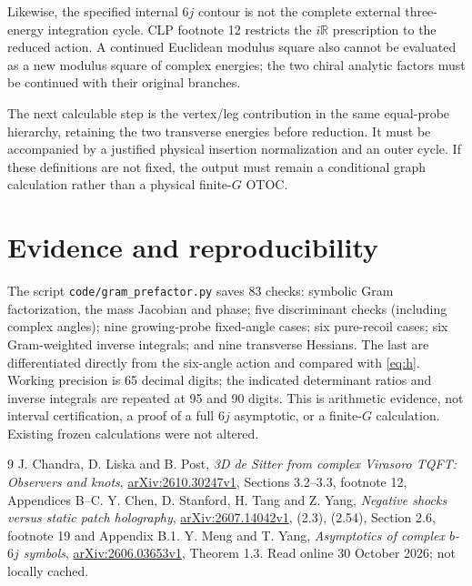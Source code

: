 \documentclass[11pt,a4paper]{article}
\begin{document}
Likewise, the specified internal \(6j\) contour is not the complete
external three-energy integration cycle. CLP footnote 12 restricts
the \(i\mathbb R\) prescription to the reduced action.
A continued Euclidean modulus square also cannot be evaluated as a
new modulus square of complex energies; the two chiral analytic factors
must be continued with their original branches.

The next calculable step is the vertex/leg contribution in the same
equal-probe hierarchy, retaining the two transverse energies before
reduction. It must be accompanied by a justified physical insertion
normalization and an outer cycle. If these definitions are not fixed,
the output must remain a conditional graph calculation rather than a
physical finite-\(G\) OTOC.

\section{Evidence and reproducibility}
The script \texttt{code/gram\_prefactor.py} saves 83 checks:
symbolic Gram factorization, the mass Jacobian and phase;
five discriminant checks (including complex angles);
nine growing-probe fixed-angle cases; six pure-recoil cases;
six Gram-weighted inverse integrals; and nine transverse Hessians.
The last are differentiated directly from the six-angle action and
compared with \eqref{eq:h}. Working precision is 65 decimal digits;
the indicated determinant ratios and inverse integrals are repeated
at 95 and 90 digits. This is arithmetic evidence, not interval
certification, a proof of a full \(6j\) asymptotic, or a finite-\(G\)
calculation. Existing frozen calculations were not altered.

\begin{thebibliography}{9}
 J. Chandra, D. Liska and B. Post,
\emph{3D de Sitter from complex Virasoro TQFT: Observers and knots},
\href{https://arxiv.org/html/2610.30247v1}{arXiv:2610.30247v1},
Sections 3.2--3.3, footnote 12, Appendices B--C.
 Y. Chen, D. Stanford, H. Tang and Z. Yang,
\emph{Negative shocks versus static patch holography},
\href{https://arxiv.org/html/2607.14042v1}{arXiv:2607.14042v1},
(2.3), (2.54), Section 2.6, footnote 19 and Appendix B.1.
 Y. Meng and T. Yang,
\emph{Asymptotics of complex \(b\)-\(6j\) symbols},
\href{https://arxiv.org/html/2606.03653v1}{arXiv:2606.03653v1},
Theorem 1.3. Read online 30 October 2026; not locally cached.
\end{thebibliography}
\end{document}
